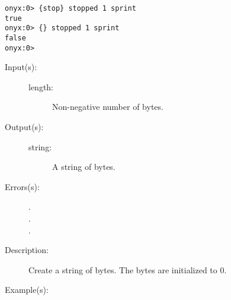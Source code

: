 \begin{description}
\begin{description}
\begin{verbatim}
onyx:0> {stop} stopped 1 sprint
true
onyx:0> {} stopped 1 sprint
false
onyx:0>
		\end{verbatim}
	\end{description}
\label{systemdict:string}
\item[{\onyxop{length}{string}{string}}: ]
	\begin{description}\item[]
	\item[Input(s): ]
		\begin{description}\item[]
		\item[length: ]
			Non-negative number of bytes.
		\end{description}
	\item[Output(s): ]
		\begin{description}\item[]
		\item[string: ]
			A string of  bytes.
		\end{description}
	\item[Errors(s): ]
		\begin{description}\item[]
		\item[.]
		\item[.]
		\item[.]
		\end{description}
	\item[Description: ]
		Create a string of  bytes.  The bytes are
		initialized to 0.
	\item[Example(s): ]\begin{verbatim}


\end{verbatim}
\end{description}
\end{description}
